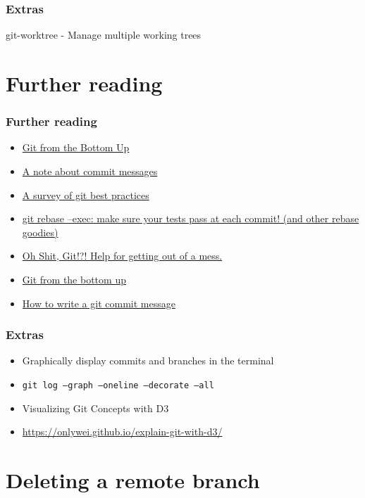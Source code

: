 \documentclass{git_course}
\begin{document}
\begin{frame}
\frametitle{Extras}
git-worktree - Manage multiple working trees
\end{frame}

\section{Further reading}

\begin{frame}
\frametitle{Further reading}
\begin{itemize}
    \item \href{http://jwiegley.github.io/git-from-the-bottom-up/}{Git from the Bottom Up}
    \item \href{http://tbaggery.com/2008/04/19/a-note-about-git-commit-messages.html}
               {A note about commit messages}
    \item \href{https://xdg.me/blog/a-survey-of-git-best-practices/}
               {A survey of git best practices}
    \item \href{http://kamalmarhubi.com/blog/2016/03/08/git-rebase-exec-make-sure-your-tests-pass-at-each-commit-and-other-rebase-goodies/}
               {git rebase --exec: make sure your tests pass at each commit!  (and other rebase goodies)}
    \item \href{https://ohshitgit.com/}{Oh Shit, Git!?!  Help for getting out of a mess.}
    \item \href{https://jwiegley.github.io/git-from-the-bottom-up/}{Git from the bottom up}
    \item \href{https://cbea.ms/git-commit/}{How to write a git commit message}
\end{itemize}
\end{frame}

\begin{frame}
    \frametitle{Extras}
    \begin{itemize}
        \item Graphically display commits and branches in the terminal
        \item \texttt{git log --graph --oneline --decorate --all}
        \item Visualizing Git Concepts with D3
        \item \url{https://onlywei.github.io/explain-git-with-d3/}
    \end{itemize}
\end{frame}

\section{Deleting a remote branch}
\end{document}
